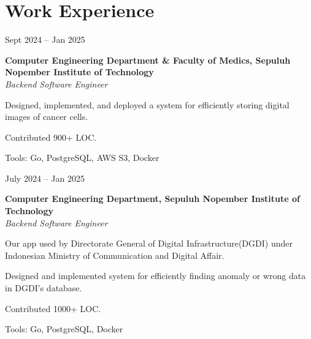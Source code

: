 \section{Work Experience}

    \begin{twocolentry}{
        Sept 2024 – Jan 2025
    }

    \textbf{Computer Engineering Department \& Faculty of Medics, Sepuluh Nopember Institute of Technology}\\
    \textit{Backend Software Engineer}
    \end{twocolentry}

    \vspace{0.10 cm}
    \begin{onecolentry}
        \begin{highlights}
            \item Designed, implemented, and deployed a system for efficiently storing digital images of cancer cells.
            \item Contributed 900+ LOC.
            \item Tools: Go, PostgreSQL, AWS S3, Docker
        \end{highlights}
    \end{onecolentry}

    \vspace{0.2 cm}

    \begin{twocolentry}{
        July 2024 – Jan 2025
    }

    \textbf{Computer Engineering Department, Sepuluh Nopember Institute of Technology }\\
    \textit{Backend Software Engineer}
    \end{twocolentry}

    \vspace{0.10 cm}
    \begin{onecolentry}
        \begin{highlights}
            \item Our app used by Directorate General of Digital Infrastructure(DGDI) under Indonesian Ministry of Communication and Digital Affair.
            \item Designed and implemented system for efficiently finding anomaly or wrong data in DGDI's database.
            \item Contributed 1000+ LOC.
            \item Tools: Go, PostgreSQL, Docker
        \end{highlights}
    \end{onecolentry}

